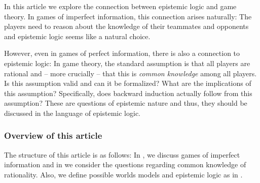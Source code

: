 In this article we explore the connection between epistemic logic and game theory. In games of imperfect information, this connection arises naturally: The players need to reason about the knowledge of their teammates and opponents and epistemic logic seems like a natural choice.

However, even in games of perfect information, there is also a connection to epistemic logic: In game theory, the standard assumption is that all players are rational and -- more crucially -- that this is \emph{common knowledge} among all players. Is this assumption valid and can it be formalized? What are the implications of this assumption? Specifically, does backward induction actually follow from this assumption? These are questions of epistemic nature and thus, they should be discussed in the language of epistemic logic.

\subsubsection*{Overview of this article}

The structure of this article is as follows: In , we discuss games of imperfect information and in  we consider the questions regarding common knowledge of rationality. Also, we define possible worlds models and epistemic logic as in \cite{fagin1995a}.